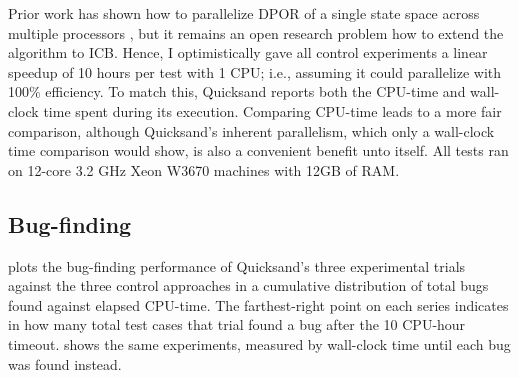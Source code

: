 Prior work has shown how to parallelize DPOR of a single state space across multiple processors \cite{parallel-dpor},
but it remains an open research problem how to extend the algorithm to ICB.
Hence, I optimistically gave all control experiments a linear speedup of 10 hours per test with 1 CPU;
i.e., assuming it could parallelize with 100\% efficiency.
To match this,
Quicksand reports both the CPU-time and wall-clock time spent during its execution.
Comparing CPU-time leads to a more fair comparison,
although Quicksand's inherent parallelism, which only a wall-clock time comparison would show,
is also a convenient benefit unto itself.
All tests ran on 12-core 3.2 GHz Xeon W3670 machines with 12GB of RAM.


\subsection{Bug-finding}
\label{sec:quicksand-eval-bugs}

plots the bug-finding performance of Quicksand's three experimental trials
against the three control approaches
in a cumulative distribution of total bugs found against elapsed CPU-time.
The farthest-right point on each series indicates in how many total test cases that trial found a bug
after the 10 CPU-hour timeout.
 shows
the same experiments, measured by wall-clock time until each bug was found instead.

